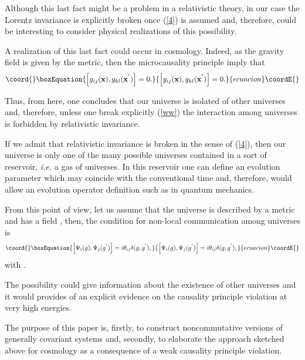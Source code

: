 \documentclass[a4paper,aps,twocolumn,amsfonts]{revtex4}
\begin{document}
Although this last fact might be a problem  in a relativistic theory, in our case  the Lorentz invariance is explicitly broken once (\ref{4}) is assumed and, therefore, could be interesting to consider physical realizations of this  possibility.

A realization of this last fact could occur in cosmology. Indeed, as the gravity field is given by the metric, then the microcausality principle imply that
\begin{equation}\coord{}\boxEquation{
\left[ g_{ij}({\bf x}), g_{kl}({\bf x}^{'})\right] = 0. \label{ww}
}{
\left[ g_{ij}({\bf x}), g_{kl}({\bf x}^{'})\right] = 0. }{ecuacion}\coordE{}\end{equation}

Thus, from here, one concludes that our universe is isolated of other universes and, therefore, unless one break explicitly (\ref{ww}) the interaction among universes is forbidden by relativistic  invariance.

If we admit that relativistic invariance is broken in the sense of (\ref{4}), then our universe is only one of the many possible universes contained in a sort of reservoir, {\it i.e.} a gas of universes. In this reservoir one can define an evolution  parameter \coordHE{} which may coincide with the conventional time and, therefore, would allow  an evolution operator definition such as in quantum mechanics.

   From this point of view, let us assume that the universe \coordHE{} is described by a metric \coordHE{} and has a field  \coordHE{}, then, the condition for non-local communication  among universes is
   \begin{equation}\coord{}\boxEquation{
   \left[ \Psi_i (g), \Psi_j (g^{'}) \right] = i \theta_{ij} \delta (g,g^{'}),
   \label{5}
   }{
   \left[ \Psi_i (g), \Psi_j (g^{'}) \right] = i \theta_{ij} \delta (g,g^{'}),
   }{ecuacion}\coordE{}\end{equation}
   with \coordHE{}.

   The possibility \coordHE{} could give information about the existence of other universes  and it would provides of an explicit evidence on the causality principle violation at very high energies.

   The purpose of this paper is, firstly,  to construct noncommutative versions of generally covariant systems and, secondly, to elaborate the approach sketched above for cosmology as a consequence of a weak causality principle violation.
\end{document}
